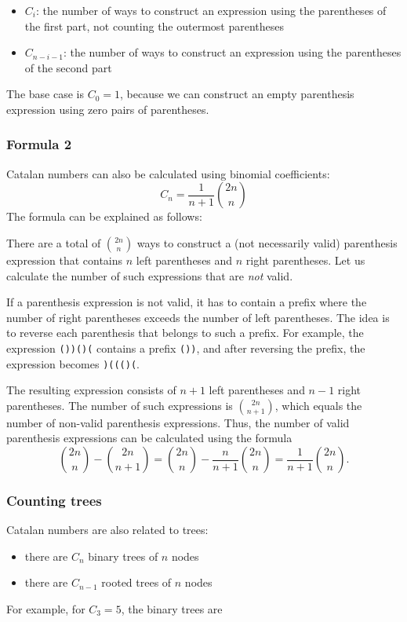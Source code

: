 \begin{itemize}
\item $C_{i}$: the number of ways to construct an expression
using the parentheses of the first part,
not counting the outermost parentheses
\item $C_{n-i-1}$: the number of ways to construct an
expression using the parentheses of the second part
\end{itemize}

The base case is $C_0=1$,
because we can construct an empty parenthesis
expression using zero pairs of parentheses.

\subsubsection{Formula 2}

Catalan numbers can also be calculated
using binomial coefficients:
\[ C_n = \frac{1}{n+1} \binom{2n}{n} \]
The formula can be explained as follows:

There are a total of $\binom{2n}{n}$ ways
to construct a (not necessarily valid)
parenthesis expression that contains $n$ left
parentheses and $n$ right parentheses.
Let us calculate the number of such
expressions that are \emph{not} valid.

If a parenthesis expression is not valid,
it has to contain a prefix where the
number of right parentheses exceeds the
number of left parentheses.
The idea is to reverse each parenthesis
that belongs to such a prefix.
For example, the expression
\texttt{())()(} contains a prefix \texttt{())},
and after reversing the prefix,
the expression becomes \texttt{)((()(}.

The resulting expression consists of $n+1$
left parentheses and $n-1$ right parentheses.
The number of such expressions is $\binom{2n}{n+1}$,
which equals the number of non-valid
parenthesis expressions.
Thus, the number of valid parenthesis
expressions can be calculated using the formula
\[ \binom{2n}{n} - \binom{2n}{n+1} = \binom{2n}{n} - \frac{n}{n+1} \binom{2n}{n} = \frac{1}{n+1} \binom{2n}{n}. \]

\subsubsection{Counting trees}

Catalan numbers are also related to trees:

\begin{itemize}
\item there are $C_n$ binary trees of $n$ nodes
\item there are $C_{n-1}$ rooted trees of $n$ nodes
\end{itemize}
\noindent
For example, for $C_3=5$, the binary trees are

